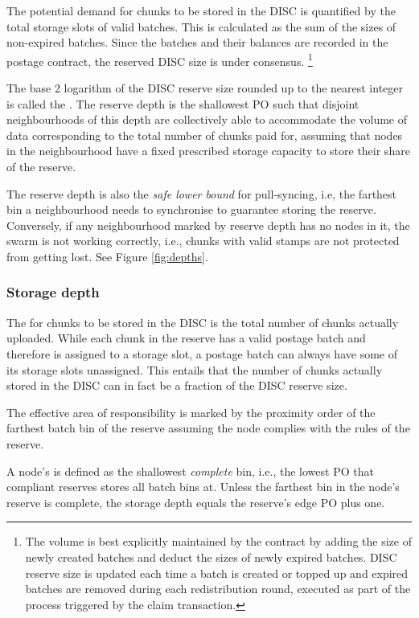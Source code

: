 The potential demand for chunks to be stored in the DISC is quantified by the total storage slots of valid batches. This is calculated as the sum of the sizes of non-expired batches. Since the batches and their balances are recorded in the postage contract, the reserved DISC size is under consensus.%
%
\footnote{The volume is best explicitly maintained by the contract by adding the size of newly created batches and deduct the sizes of newly expired batches. DISC reserve size is updated each time a batch is created or topped up and expired batches are removed during each redistribution round, executed as part of the process triggered by the claim transaction.}  

The base 2 logarithm of the DISC reserve size rounded up to the nearest integer is called the . The reserve depth is the shallowest PO such that disjoint neighbourhoods of this depth are collectively able to accommodate the volume of data corresponding to the total number of chunks paid for, assuming that nodes in the neighbourhood have a fixed prescribed storage capacity to store their share of the reserve. 

The reserve depth is also the \emph{safe lower bound} for pull-syncing, i.e, the farthest bin a neighbourhood needs to synchronise to guarantee storing the reserve.
Conversely, if any neighbourhood marked by reserve depth has no nodes in it, the swarm is not working correctly, i.e., chunks with valid stamps are not protected from getting lost. See Figure \ref{fig:depths}.

\subsubsection{Storage depth}

The  for chunks to be stored in the DISC is the total number of chunks actually uploaded. While each chunk in the reserve has a valid postage batch and therefore is assigned to a storage slot, a postage batch can always have some of its storage slots unassigned. This entails that the number of chunks actually stored in the DISC can in fact be a fraction of the DISC reserve size. 

The effective area of responsibility is  marked by the proximity order of the farthest batch bin of the reserve assuming the node complies with the rules of the reserve. 

A node's  is defined as the shallowest \emph{complete} bin, i.e., the lowest PO that compliant reserves stores all batch bins at. Unless the farthest bin in the node's reserve is complete, the storage depth equals the reserve's edge PO plus one.

